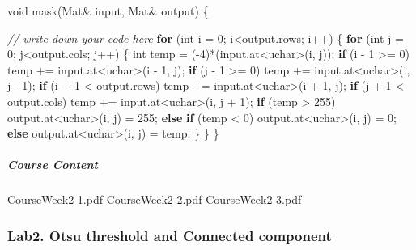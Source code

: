 \documentclass[]{article}
\newenvironment{Shaded}{\begin{snugshade}}{\end{snugshade}}
\newcommand{\KeywordTok}[1]{\textcolor[rgb]{0.13,0.29,0.53}{\textbf{{#1}}}}
\newcommand{\DataTypeTok}[1]{\textcolor[rgb]{0.13,0.29,0.53}{{#1}}}
\newcommand{\DecValTok}[1]{\textcolor[rgb]{0.00,0.00,0.81}{{#1}}}
\newcommand{\CommentTok}[1]{\textcolor[rgb]{0.56,0.35,0.01}{\textit{{#1}}}}
\newcommand{\NormalTok}[1]{{#1}}
\let\oldsubparagraph\subparagraph
\renewcommand{\subparagraph}[1]{\oldsubparagraph{#1}\mbox{}}
\begin{document}
\begin{Shaded}
\begin{Highlighting}[]
\DataTypeTok{void}  \NormalTok{mask(Mat& input, Mat& output) \{}

    \CommentTok{// write down your code here}
    \KeywordTok{for} \NormalTok{(}\DataTypeTok{int} \NormalTok{i = }\DecValTok{0}\NormalTok{; i<output.rows; i++) \{}
        \KeywordTok{for} \NormalTok{(}\DataTypeTok{int} \NormalTok{j = }\DecValTok{0}\NormalTok{; j<output.cols; j++) \{}
            \DataTypeTok{int} \NormalTok{temp = (}\DecValTok{-4}\NormalTok{)*(input.at<}\DataTypeTok{uchar}\NormalTok{>(i, j));}
            \KeywordTok{if} \NormalTok{(i - }\DecValTok{1} \NormalTok{>= }\DecValTok{0}\NormalTok{)}
                \NormalTok{temp += input.at<}\DataTypeTok{uchar}\NormalTok{>(i - }\DecValTok{1}\NormalTok{, j);}
            \KeywordTok{if} \NormalTok{(j - }\DecValTok{1} \NormalTok{>= }\DecValTok{0}\NormalTok{)}
                \NormalTok{temp += input.at<}\DataTypeTok{uchar}\NormalTok{>(i, j - }\DecValTok{1}\NormalTok{);}
            \KeywordTok{if} \NormalTok{(i + }\DecValTok{1} \NormalTok{< output.rows)}
                \NormalTok{temp += input.at<}\DataTypeTok{uchar}\NormalTok{>(i + }\DecValTok{1}\NormalTok{, j);}
            \KeywordTok{if} \NormalTok{(j + }\DecValTok{1} \NormalTok{< output.cols)}
                \NormalTok{temp += input.at<}\DataTypeTok{uchar}\NormalTok{>(i, j + }\DecValTok{1}\NormalTok{);}
            \KeywordTok{if} \NormalTok{(temp > }\DecValTok{255}\NormalTok{)}
                \NormalTok{output.at<}\DataTypeTok{uchar}\NormalTok{>(i, j) = }\DecValTok{255}\NormalTok{;}
            \KeywordTok{else} \KeywordTok{if} \NormalTok{(temp < }\DecValTok{0}\NormalTok{)}
                \NormalTok{output.at<}\DataTypeTok{uchar}\NormalTok{>(i, j) = }\DecValTok{0}\NormalTok{;}
            \KeywordTok{else}
                \NormalTok{output.at<}\DataTypeTok{uchar}\NormalTok{>(i, j) = temp;}
        \NormalTok{\}}
    \NormalTok{\}}
\NormalTok{\}}
\end{Highlighting}
\end{Shaded}

\subparagraph{Course Content}\label{course-content-1}

CourseWeek2-1.pdf CourseWeek2-2.pdf CourseWeek2-3.pdf

\subsubsection{Lab2. Otsu threshold and Connected
component}\label{lab2.-otsu-threshold-and-connected-component}
\end{document}
